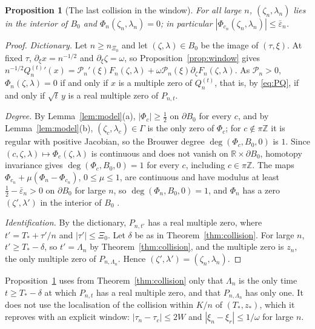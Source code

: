 \documentclass[11pt]{amsart}
\newtheorem{proposition}[theorem]{Proposition}
\theoremstyle{definition}
\theoremstyle{remark}
\numberwithin{equation}{section}
\newcommand{\R}{\mathbb{R}}
\newcommand{\Z}{\mathbb{Z}}
\newcommand{\eps}{\varepsilon}
\begin{document}
\begin{proposition}[The last collision in the window]\label{prop:threshold}
For all large $n$, $(\zeta_n,\lambda_n)$ lies in the interior of $B_0$ and $\Phi_n(\zeta_n,\lambda_n)=0$; in particular
$|\Phi_{c_n}(\zeta_n,\lambda_n)|\le\bar\eps_n$.
\end{proposition}

\begin{proof}
\emph{Dictionary.} Let $n\ge n_{\Xi_0}$ and let $(\zeta,\lambda)\in B_0$ be the image of $(\tau,\xi)$. At fixed $\tau$,
$\partial_\xi x=n^{-1/2}$ and $\partial_\xi\zeta=\omega$, so Proposition~\ref{prop:window} gives
$n^{-1/2}Q_n^{(t)}{}'(x)=\mathcal P_n'(\xi)F_n(\zeta,\lambda)+\omega\mathcal P_n(\xi)\partial_\zeta F_n(\zeta,\lambda)$. As
$\mathcal P_n>0$, $\Phi_n(\zeta,\lambda)=0$ if and only if $x$ is a multiple zero of $Q_n^{(t)}$, that is, by
\eqref{eq:PQ}, if and only if $\sqrt t\,y$ is a real multiple zero of $P_{n,t}$.

\emph{Degree.} By Lemma~\ref{lem:model}(a), $|\Phi_c|\ge\frac12$ on $\partial B_0$ for every $c$, and by
Lemma~\ref{lem:model}(b), $(\zeta_c,\lambda_c)\in\Gamma$ is the only zero of $\Phi_c$; for $c\notin\pi\Z$ it is regular
with positive Jacobian, so the Brouwer degree $\deg(\Phi_c,B_0,0)$ is $1$. Since $(c,\zeta,\lambda)\mapsto\Phi_c(\zeta,\lambda)$
is continuous and does not vanish on $\R\times\partial B_0$, homotopy invariance gives $\deg(\Phi_c,B_0,0)=1$ for every
$c$, including $c\in\pi\Z$. The maps $\Phi_{c_n}+\mu(\Phi_n-\Phi_{c_n})$, $0\le\mu\le1$, are continuous and
have modulus at least $\frac12-\bar\eps_n>0$ on $\partial B_0$ for large $n$, so $\deg(\Phi_n,B_0,0)=1$, and $\Phi_n$ has a
zero $(\zeta',\lambda')$ in the interior of $B_0$ \cite[Ch.~1]{De}.

\emph{Identification.} By the dictionary, $P_{n,t'}$ has a real multiple zero, where $t'=T_*+\tau'/n$ and
$|\tau'|\le \Xi_0$. Let $\delta$ be as in Theorem~\ref{thm:collision}. For large $n$, $t'\ge T_*-\delta$, so $t'=\Lambda_n$ by
Theorem~\ref{thm:collision}, and the multiple zero is $z_n$, the only multiple zero of $P_{n,\Lambda_n}$. Hence
$(\zeta',\lambda')=(\zeta_n,\lambda_n)$.
\end{proof}

Proposition~\ref{prop:threshold} uses from Theorem~\ref{thm:collision} only that $\Lambda_n$ is the only time
$t\ge T_*-\delta$ at which $P_{n,t}$ has a real multiple zero, and that $P_{n,\Lambda_n}$ has only one. It does not use
the localisation of the collision within $K/n$ of $(T_*,z_*)$, which it reproves with an explicit window:
$|\tau_n-\tau_c|\le2W$ and $|\xi_n-\xi_r|\le1/\omega$ for large $n$.
\end{document}
